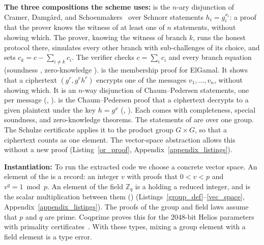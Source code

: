 \textbf{The three compositions the scheme uses:}
 is the $n$-ary
disjunction of Cramer, Damg\aa rd, and Schoenmakers~\cite{cramer1994proofs}
over Schnorr statements $h_i = g_i^{x_i}$: a proof that the prover knows
the witness of at least one of $n$ statements, without showing which.
The prover, knowing the witness of branch $k$, runs the honest protocol
there, simulates every other branch with sub-challenges of its choice,
and sets $c_k = c - \sum_{i\ne k} c_i$. The verifier checks $c = \sum_i c_i$ and every branch equation (soundness , zero-knowledge ).
 is the membership proof for ElGamal. It shows that a ciphertext
$(g^r, g^v h^r)$ encrypts one of the messages $v_1,\ldots,v_n$, without
showing which. It is an $n$-way disjunction of Chaum--Pedersen
statements, one per message (, ).
 is the Chaum--Pedersen proof that a ciphertext decrypts
to a given plaintext under the key $h = g^x$ (, ). Each comes with completeness,
special soundness, and zero-knowledge theorems. The statements
of  are over one group. The Schulze certificate applies
it to the product group $G \times G$, so that a ciphertext counts as one
element. The vector-space abstraction allows this without a new proof
(Listing~\ref{or_proof}, Appendix~\ref{appendix_listings}).

\textbf{Instantiation:}
To run the extracted code we choose a concrete vector space. An element
of the  is a record: an integer $v$
with proofs that $0 < v < p$ and $v^q = 1 \bmod p$. An element of the
field $\mathbb{Z}_q$ is a  holding a reduced integer,
and  is the scalar multiplication between them
()
(Listings~\ref{group_def}--\ref{vec_space}, Appendix~\ref{appendix_listings}).
The proofs of the group and field laws assume that $p$ and $q$ are
prime. Coqprime proves this for the 2048-bit Helios
parameters~\cite{adida2008helios} with primality
certificates~\cite{thery2007primality}. With these types, mixing a
group element with a field element is a type error.

